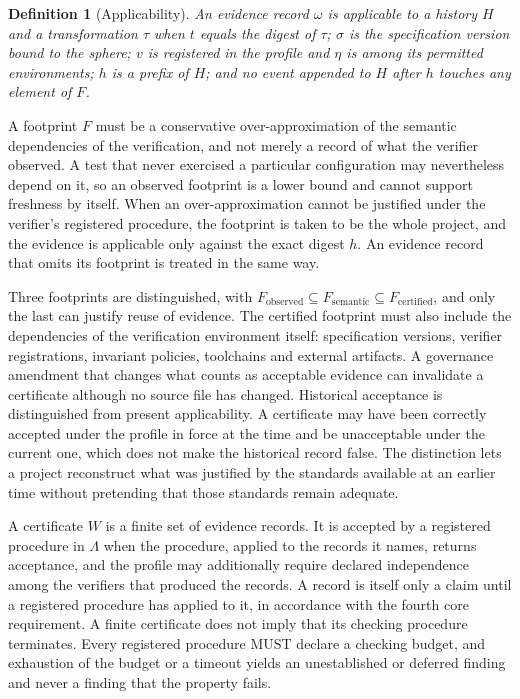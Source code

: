\documentclass[11pt]{article}
\newtheorem{definition}{Definition}
\theoremstyle{remark}
\begin{document}
\begin{definition}[Applicability]
An evidence record $\omega$ is \emph{applicable} to a history $H$ and a transformation $\tau$ when $t$ equals the digest of $\tau$; $\sigma$ is the specification version bound to the sphere; $v$ is registered in the profile and $\eta$ is among its permitted environments; $h$ is a prefix of $H$; and no event appended to $H$ after $h$ touches any element of $F$.
\end{definition}

A footprint $F$ must be a conservative over-approximation of the semantic dependencies of the verification, and not merely a record of what the verifier observed. A test that never exercised a particular configuration may nevertheless depend on it, so an observed footprint is a lower bound and cannot support freshness by itself. When an over-approximation cannot be justified under the verifier's registered procedure, the footprint is taken to be the whole project, and the evidence is applicable only against the exact digest $h$. An evidence record that omits its footprint is treated in the same way.

Three footprints are distinguished, with $F_{\mathrm{observed}}\subseteq F_{\mathrm{semantic}}\subseteq F_{\mathrm{certified}}$, and only the last can justify reuse of evidence. The certified footprint must also include the dependencies of the verification environment itself: specification versions, verifier registrations, invariant policies, toolchains and external artifacts. A governance amendment that changes what counts as acceptable evidence can invalidate a certificate although no source file has changed. Historical acceptance is distinguished from present applicability. A certificate may have been correctly accepted under the profile in force at the time and be unacceptable under the current one, which does not make the historical record false. The distinction lets a project reconstruct what was justified by the standards available at an earlier time without pretending that those standards remain adequate.

A certificate $W$ is a finite set of evidence records. It is accepted by a registered procedure in $\Lambda$ when the procedure, applied to the records it names, returns acceptance, and the profile may additionally require declared independence among the verifiers that produced the records. A record is itself only a claim until a registered procedure has applied to it, in accordance with the fourth core requirement. A finite certificate does not imply that its checking procedure terminates. Every registered procedure MUST declare a checking budget, and exhaustion of the budget or a timeout yields an unestablished or deferred finding and never a finding that the property fails.
\end{document}
